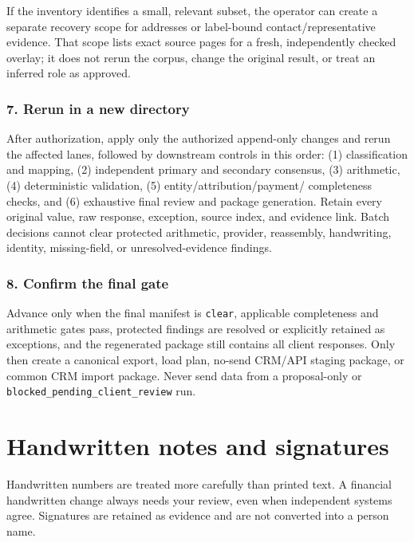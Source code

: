 \documentclass[
]{article}
\begin{document}
If the inventory identifies a small, relevant subset, the operator can
create a separate recovery scope for addresses or label-bound
contact/representative evidence. That scope lists exact source pages for
a fresh, independently checked overlay; it does not rerun the corpus,
change the original result, or treat an inferred role as approved.

\subsubsection{7. Rerun in a new
directory}\label{rerun-in-a-new-directory}

After authorization, apply only the authorized append-only changes and
rerun the affected lanes, followed by downstream controls in this order:
(1) classification and mapping, (2) independent primary and secondary
consensus, (3) arithmetic, (4) deterministic validation, (5)
entity/attribution/payment/ completeness checks, and (6) exhaustive
final review and package generation. Retain every original value, raw
response, exception, source index, and evidence link. Batch decisions
cannot clear protected arithmetic, provider, reassembly, handwriting,
identity, missing-field, or unresolved-evidence findings.

\subsubsection{8. Confirm the final gate}\label{confirm-the-final-gate}

Advance only when the final manifest is \texttt{clear}, applicable
completeness and arithmetic gates pass, protected findings are resolved
or explicitly retained as exceptions, and the regenerated package still
contains all client responses. Only then create a canonical export, load
plan, no-send CRM/API staging package, or common CRM import package.
Never send data from a proposal-only or
\texttt{blocked\_\allowbreak{}pending\_\allowbreak{}client\_\allowbreak{}review}
run.

\section{Handwritten notes and
signatures}\label{handwritten-notes-and-signatures}

Handwritten numbers are treated more carefully than printed text. A
financial handwritten change always needs your review, even when
independent systems agree. Signatures are retained as evidence and are
not converted into a person name.
\end{document}
